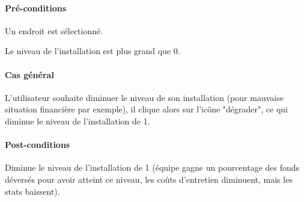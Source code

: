 \paragraph{Pré-conditions}
\begin{list}{}{\leftmargin=1.5em}
\item{Un endroit est sélectionné.}
\item{Le niveau de l'installation est plus grand que 0.}
\end{list}
\paragraph{Cas général}
L'utilisateur souhaite diminuer le niveau de son installation (pour mauvaise situation financière par exemple), il clique alors sur l'icône "dégrader", ce qui diminue le niveau de l'installation de 1. 
\paragraph{Post-conditions}
Diminue le niveau de l'installation de 1 (équipe gagne un pourcentage des fonds déversés pour avoir atteint ce niveau, les coûts d'entretien diminuent, mais les stats baissent).


